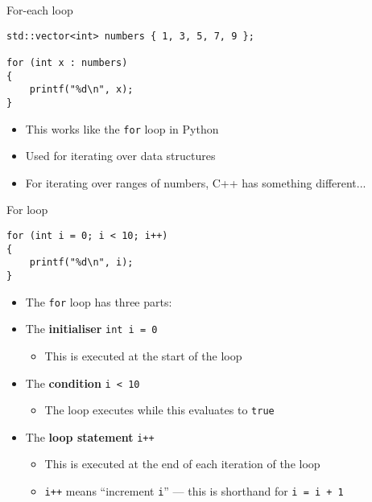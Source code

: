 \begin{frame}[fragile]{For-each loop}
	\begin{lstlisting}
std::vector<int> numbers { 1, 3, 5, 7, 9 };

for (int x : numbers)
{
    printf("%d\n", x);
}
	\end{lstlisting}
    \pause
	\begin{itemize}
		\item This works like the \lstinline{for} loop in Python \pause
		\item Used for iterating over data structures \pause
		\item For iterating over ranges of numbers, C++ has something different...
	\end{itemize}
\end{frame}

\begin{frame}[fragile]{For loop}
	\begin{lstlisting}
for (int i = 0; i < 10; i++)
{
    printf("%d\n", i);
}
	\end{lstlisting}
	\pause
    \begin{itemize}
        \item The \lstinline{for} loop has three parts: \pause
        \item The \textbf{initialiser} \lstinline{int i = 0}
        \begin{itemize}
            \item This is executed at the start of the loop
        \end{itemize} \pause
        \item The \textbf{condition} \lstinline{i < 10}
        \begin{itemize}
            \item The loop executes while this evaluates to \lstinline{true}
        \end{itemize} \pause
        \item The \textbf{loop statement} \lstinline{i++}
        \begin{itemize}
            \item This is executed at the end of each iteration of the loop
            \item \lstinline{i++} means ``increment \lstinline{i}'' --- this is shorthand for \lstinline{i = i + 1}
        \end{itemize}
    \end{itemize}
\end{frame}

